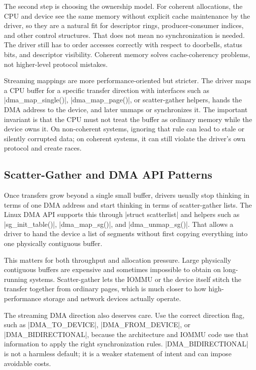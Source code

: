 \documentclass[10pt, oneside]{book}
\begin{document}
The second step is choosing the ownership model.
For coherent allocations, the CPU and device see the same memory without
explicit cache maintenance by the driver, so they are a natural fit for
descriptor rings, producer-consumer indices, and other control structures.
That does not mean no synchronization is needed.
The driver still has to order accesses correctly with respect to doorbells,
status bits, and descriptor visibility.
Coherent memory solves cache-coherency problems, not higher-level protocol
mistakes.

Streaming mappings are more performance-oriented but stricter.
The driver maps a CPU buffer for a specific transfer direction with interfaces
such as \cpp|dma_map_single()|, \cpp|dma_map_page()|, or scatter-gather helpers,
hands the DMA address to the device, and later unmaps or synchronizes it.
The important invariant is that the CPU must not treat the buffer as ordinary
memory while the device owns it.
On non-coherent systems, ignoring that rule can lead to stale or silently
corrupted data; on coherent systems, it can still violate the driver's own
protocol and create races.

\subsection{Scatter-Gather and DMA API Patterns}
\label{sec:dma_sg}
Once transfers grow beyond a single small buffer, drivers usually stop thinking
in terms of one DMA address and start thinking in terms of scatter-gather
lists.
The Linux DMA API supports this through \cpp|struct scatterlist| and helpers
such as \cpp|sg_init_table()|, \cpp|dma_map_sg()|, and \cpp|dma_unmap_sg()|.
That allows a driver to hand the device a list of segments without first
copying everything into one physically contiguous buffer.

This matters for both throughput and allocation pressure.
Large physically contiguous buffers are expensive and sometimes impossible to
obtain on long-running systems.
Scatter-gather lets the IOMMU or the device itself stitch the transfer together
from ordinary pages, which is much closer to how high-performance storage and
network devices actually operate.

The streaming DMA direction also deserves care.
Use the correct direction flag, such as \cpp|DMA_TO_DEVICE|,
\cpp|DMA_FROM_DEVICE|, or \cpp|DMA_BIDIRECTIONAL|, because the architecture and
IOMMU code use that information to apply the right synchronization rules.
\cpp|DMA_BIDIRECTIONAL| is not a harmless default; it is a weaker statement of
intent and can impose avoidable costs.
\end{document}
